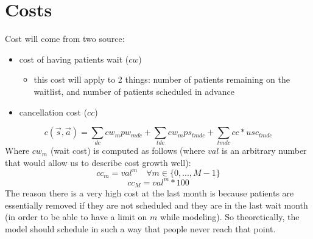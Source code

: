 \documentclass{article}
\begin{document}
\section{Costs}
Cost will come from two source:  
\begin{itemize} 
	\item cost of having patients wait ($cw$)
		\begin{itemize}
			\item this cost will apply to 2 things: number of patients remaining on the waitlist, and number of patients scheduled in advance
		\end{itemize}
	\item cancellation cost ($cc$)
\end{itemize}
\[ c(\vec{s}, \vec{a}) = \sum_{dc} cw_{m} pw_{mdc} + \sum_{tdc} cw_{m} ps_{tmdc} + \sum_{tmdc} cc * usc_{tmdc}\]
Where $cw_{m}$ (wait cost) is computed as follows (where $val$ is an arbitrary number that would allow us to describe cost growth well):
	\[ cc_{m} = val^m \quad \forall m \in \{ 0, ..., M-1 \} \]
	\[ cc_{M} = val^m * 100  \]
The reason there is a very high cost at the last month is because patients are essentially removed if they are not scheduled and they are in the last wait month (in order to be able to have a limit on $m$ while modeling). So theoretically, the model should schedule in such a way that people never reach that point.
\end{document}
